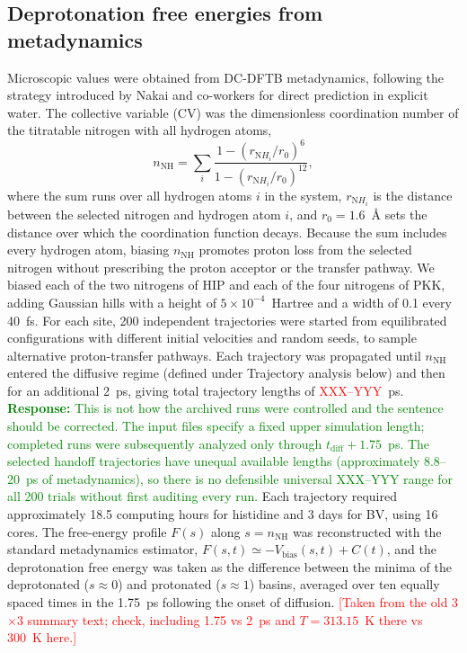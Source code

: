 \subsection{Deprotonation free energies from metadynamics}

Microscopic \pka{} values were obtained from DC-DFTB metadynamics,\cite{barducciMetadynamics2011} following the strategy introduced by Nakai and co-workers for direct \pka{} prediction in explicit water.\cite{Sakti2018}
The collective variable (CV) was the dimensionless coordination number of the titratable nitrogen with all hydrogen atoms,\cite{Tummanapelli2015Amino,Tummanapelli2015Polyprotic}
\begin{equation}
n_{\mathrm{NH}} = \sum_i
\frac{1-\left(r_{\mathrm{N}H_i}/r_0\right)^6}
{1-\left(r_{\mathrm{N}H_i}/r_0\right)^{12}},
\label{eq:coordination-number}
\end{equation}
where the sum runs over all hydrogen atoms $i$ in the system, $r_{\mathrm{N}H_i}$ is the distance between the selected nitrogen and hydrogen atom $i$, and $r_0=1.6$~\AA{} sets the distance over which the coordination function decays.
Because the sum includes every hydrogen atom, biasing $n_{\mathrm{NH}}$ promotes proton loss from the selected nitrogen without prescribing the proton acceptor or the transfer pathway.
We biased each of the two nitrogens of HIP and each of the four nitrogens of PKK, adding Gaussian hills with a height of $5 \times 10^{-4}$~Hartree and a width of 0.1 every 40~fs.
For each site, 200 independent trajectories were started from equilibrated configurations with different initial velocities and random seeds, to sample alternative proton-transfer pathways.
Each trajectory was propagated until $n_{\mathrm{NH}}$ entered the diffusive regime (defined under Trajectory analysis below) and then for an additional 2~ps, giving total trajectory lengths of \textcolor{red}{XXX--YYY}~ps.
\textcolor{green}{\textbf{Response:} This is not how the archived runs were controlled and the sentence should be corrected. The input files specify a fixed upper simulation length; completed runs were subsequently analyzed only through $t_{\mathrm{diff}}+1.75$~ps. The selected handoff trajectories have unequal available lengths (approximately 8.8--20~ps of metadynamics), so there is no defensible universal XXX--YYY range for all 200 trials without first auditing every run.}
Each trajectory required approximately 18.5 computing hours for histidine and 3 days for BV, using 16 cores.
The free-energy profile $F(s)$ along $s=n_{\mathrm{NH}}$ was reconstructed with the standard metadynamics estimator, $F(s,t)\simeq-V_{\mathrm{bias}}(s,t)+C(t)$, and the deprotonation free energy was taken as the difference between the minima of the deprotonated ($s\approx0$) and protonated ($s\approx1$) basins, averaged over ten equally spaced times in the 1.75~ps following the onset of diffusion. \textcolor{red}{[Taken from the old 3$\times$3 summary text; check, including 1.75 vs 2~ps and $T=313.15$~K there vs 300~K here.]}
